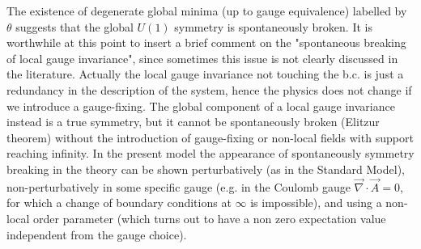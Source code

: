 \documentclass[../main/main.tex]{subfiles}
\begin{document}
\skipline


The existence of degenerate global minima (up to gauge equivalence) labelled by $\theta$ suggests that the global $U(1)$ symmetry is spontaneously broken. 
It is worthwhile at this point to insert a brief comment on the "spontaneous breaking of local gauge invariance", since sometimes this issue is not clearly discussed in the literature. Actually the local gauge invariance not touching the b.c. is just a redundancy in the description of the system, hence the physics does not change if we introduce a gauge-fixing. The global component of a local gauge invariance instead is a true symmetry, but it cannot be spontaneously broken (Elitzur theorem) without the introduction of gauge-fixing or non-local fields with support reaching infinity.
In the present model the appearance of spontaneously symmetry breaking in the theory can be shown perturbatively (as in the Standard Model), non-perturbatively in some specific gauge (e.g. in the Coulomb gauge $\vec\nabla\cdot\vec A=0$, for which a change of boundary conditions at $\infty$ is impossible), and using a non-local order parameter (which turns out to have a non zero expectation value independent from the gauge choice). 
\end{document}
